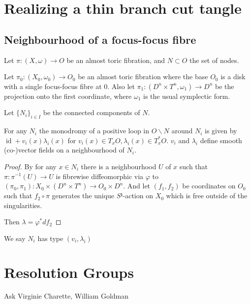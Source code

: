 \documentclass[12pt,a4paper,abstract=true,draft]{scrartcl}
\DeclareMathOperator{\id}{id}
\begin{document}
\section{Realizing a thin branch cut tangle}

\subsection{Neighbourhood of a focus-focus fibre}

Let $π \colon (X,ω) → O$ be an almost toric fibration, and $N ⊂ O$ the set of nodes.

Let $π_0 \colon (X_0,ω_0) → O_0$ be an almost toric fibration where the base $O_0$ is a disk with a single focus-focus fibre at $0$.
Also let $π_1 \colon (D^n × T^n, ω_1) → D^n$ be the projection onto the first coordinate, where $ω_1$ is the usual symplectic form.


Let $\{N_i\}_{i ∈ I}$ be the connected components of $N$.
\begin{lemma}[Monodromy]
  For any $N_i$ the monodromy of a positive loop in $O ∖ N$ around $N_i$ is given by
  $\id + v_i(x) λ_i(x)$
  for $v_i(x) ∈ T_xO, λ_i(x) ∈ T_x^*O$.
  $v_i$ and $λ_i$ define smooth (co-)vector fields on a neighbourhood of $N_i$.
\end{lemma}

\begin{proof}
By \cite[Proposition 5.4 b)]{Zun96} for any $x ∈ N_i$ there is a neighbourhood $U$ of $x$ such that $π\colon π^{-1}(U) → U$ is fibrewise diffeomorphic via $φ$ to $(π_0, π_1) \colon X_0 × (D^n × T^n) → O_0 × D^n$.
And let $(f_1,f_2)$ be coordinates on $O_0$ such that $f_2∘π$ generates the unique $S¹$-action on $X_0$ which is free outside of the singularities.

Then $λ = φ^* df_2$

\end{proof}

We say $N_i$ has type $(v_i,λ_i)$


\section{Resolution Groups}

Ask Virginie Charette, William Goldman
\end{document}
